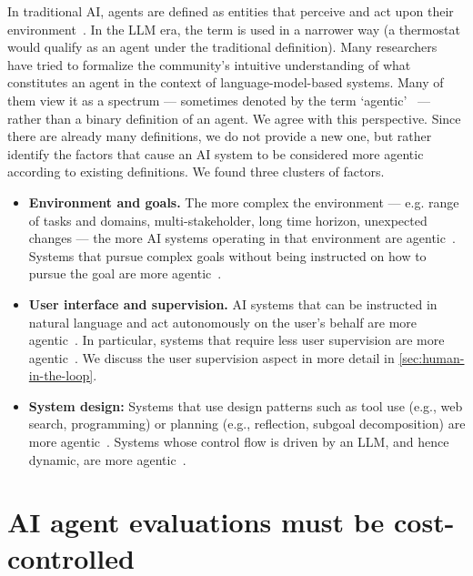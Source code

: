 \documentclass{article}
\begin{document}
In traditional AI, agents are defined as entities that perceive and act upon their environment~\citep{russell_artificial_1995}. 
In the LLM era, the term is used in a narrower way (a thermostat would qualify as an agent under the traditional definition). Many researchers have tried to formalize the community's intuitive understanding of what constitutes an agent in the context of language-model-based systems. Many of them view it as a spectrum --- sometimes denoted by the term `agentic'~\citep{ng_welcoming_2024} --- rather than a binary definition of an agent. We agree with this perspective. Since there are already many definitions, we do not provide a new one, but rather identify the factors that cause an AI system to be considered more agentic according to existing definitions. We found three clusters of factors.
\begin{itemize}[leftmargin=*]
    \item \textbf{Environment and goals.} The more complex the environment --- e.g. range of tasks and domains, multi-stakeholder, long time horizon, unexpected changes --- the more AI systems operating in that environment are agentic~\citep{shavit_practices_2023,gabriel_ethics_2024}. Systems that pursue complex goals without being instructed on how to pursue the goal are more agentic~\citep{shavit_practices_2023,chan_harms_2023,gabriel_ethics_2024}.
    \item \textbf{User interface and supervision.} AI systems that can be instructed in natural language and act autonomously on the user's behalf are more agentic~\citep{gabriel_ethics_2024}. In particular, systems that require less user supervision are more agentic~\citep{shavit_practices_2023,chan_harms_2023,gabriel_ethics_2024}. We discuss the user supervision aspect in more detail in \cref{sec:human-in-the-loop}.
    \item \textbf{System design:} Systems that use design patterns such as tool use (e.g., web search, programming) or planning (e.g., reflection, subgoal decomposition) are more agentic~\citep{weng_llm_2023,ng_welcoming_2024}. Systems whose control flow is driven by an LLM, and hence dynamic, are more agentic~\citep{weng_llm_2023,chase2024agent}.
\end{itemize}


\section{AI agent evaluations must be cost-controlled}\label{sec:cost-controlled}
\end{document}
